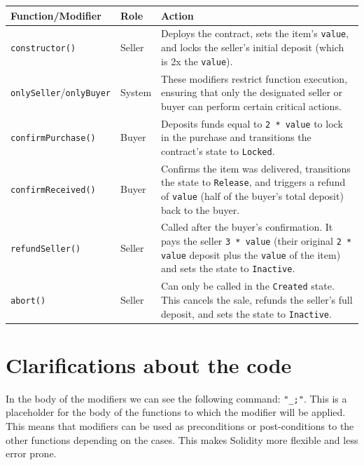 \documentclass{scrbook}
\begin{document}
\begin{tabularx}{\linewidth}{|>{\raggedright\arraybackslash}l|>{\raggedright\arraybackslash}l|>{\raggedright\arraybackslash}X|}
    \hline
    
    \textbf{Function/Modifier} & \textbf{Role} & \textbf{Action} \\
    \hline
    
    \texttt{constructor()} & Seller & Deploys the contract, sets the item's \texttt{value}, and locks the seller's initial deposit (which is 2x the \texttt{value}). \\
    \hline
    
    \texttt{onlySeller}/\texttt{onlyBuyer} & System & These modifiers restrict function execution, ensuring that only the designated seller or buyer can perform certain critical actions. \\
    \hline
    
    \texttt{confirmPurchase()} & Buyer & Deposits funds equal to \texttt{2 * value} to lock in the purchase and transitions the contract's state to \texttt{Locked}. \\
    \hline
    
    \texttt{confirmReceived()} & Buyer & Confirms the item was delivered, transitions the state to \texttt{Release}, and triggers a refund of \texttt{value} (half of the buyer's total deposit) back to the buyer. \\
    \hline
    
    \texttt{refundSeller()} & Seller & Called after the buyer's confirmation. It pays the seller \texttt{3 * value} (their original \texttt{2 * value} deposit plus the \texttt{value} of the item) and sets the state to \texttt{Inactive}. \\
    \hline
    
    \texttt{abort()} & Seller & Can only be called in the \texttt{Created} state. This cancels the sale, refunds the seller's full deposit, and sets the state to \texttt{Inactive}. \\
    \hline
\end{tabularx}
\vspace{1em}

\section{Clarifications about the code}

In the body of the modifiers we can see the following command: \texttt{"\_;"}. This is a placeholder for the body of the functions to which the modifier will be applied. This means that modifiers can be used as preconditions or post-conditions to the other functions depending on the cases. This makes Solidity more flexible and less error prone.\\
\end{document}

